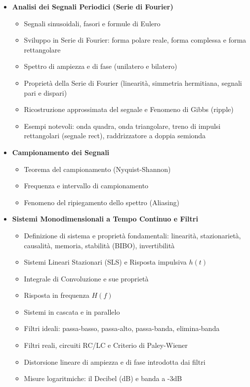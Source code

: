 \begin{itemize}
    \item \textbf{Analisi dei Segnali Periodici (Serie di Fourier)}
          \begin{itemize}
              \item Segnali sinusoidali, fasori e formule di Eulero
              \item Sviluppo in Serie di Fourier: forma polare reale, forma complessa e forma rettangolare
              \item Spettro di ampiezza e di fase (unilatero e bilatero)
              \item Proprietà della Serie di Fourier (linearità, simmetria hermitiana, segnali pari e dispari)
              \item Ricostruzione approssimata del segnale e Fenomeno di Gibbs (ripple)
              \item Esempi notevoli: onda quadra, onda triangolare, treno di impulsi rettangolari (segnale rect), raddrizzatore a doppia semionda
          \end{itemize}

    \item \textbf{Campionamento dei Segnali}
          \begin{itemize}
              \item Teorema del campionamento (Nyquist-Shannon)
              \item Frequenza e intervallo di campionamento
              \item Fenomeno del ripiegamento dello spettro (Aliasing)
          \end{itemize}

    \item \textbf{Sistemi Monodimensionali a Tempo Continuo e Filtri}
          \begin{itemize}
              \item Definizione di sistema e proprietà fondamentali: linearità, stazionarietà, causalità, memoria, stabilità (BIBO), invertibilità
              \item Sistemi Lineari Stazionari (SLS) e Risposta impulsiva $h(t)$
              \item Integrale di Convoluzione e sue proprietà
              \item Risposta in frequenza $H(f)$
              \item Sistemi in cascata e in parallelo
              \item Filtri ideali: passa-basso, passa-alto, passa-banda, elimina-banda
              \item Filtri reali, circuiti RC/LC e Criterio di Paley-Wiener
              \item Distorsione lineare di ampiezza e di fase introdotta dai filtri
              \item Misure logaritmiche: il Decibel (dB) e banda a -3dB
          \end{itemize}


\end{itemize}
